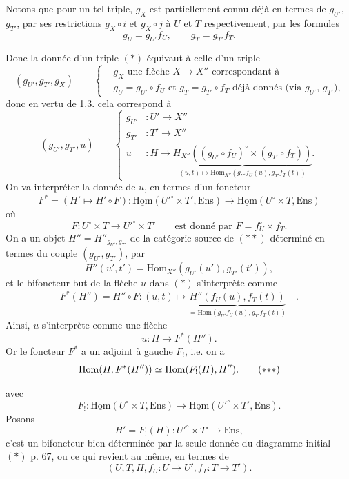 \documentclass[11pt]{article}
\newcommand{\printedpage}[1]{\marginpar{\footnotesize p.~#1}}
\newcommand{\msp}[1]{\marginpar{\footnotesize [#1]}}
\newcommand{\uHom}{\underline{\mathrm{Hom}}}
\newcommand{\Hom}{\mathrm{Hom}}
\newcommand{\Ens}{\mathrm{Ens}}
\begin{document}
Notons que pour un tel triple, $g_X$ est partiellement connu déjà en termes de $g_{U'}$, $g_{T'}$, par ses restrictions $g_X\circ i$ et $g_X\circ j$ à $U$ et $T$ respectivement, par les formules
\[
g_U = g_{U'}f_U, \qquad g_T = g_{T'}f_T.
\]

\msp{page 68} Donc la donnée d'un triple $(*)$ équivaut à celle d'un triple
\[
(g_{U'}, g_{T'}, g_X) \qquad
\left\{\begin{aligned}
&g_X \text{ une flèche } X\longrightarrow X'' \text{ correspondant à}\\
&g_U = g_{U'}\circ f_U \text{ et } g_T = g_{T'}\circ f_T \text{ déjà donnés (via } g_{U'}\text{, } g_{T'}\text{),}
\end{aligned}\right.
\]
donc en vertu de 1.3. cela correspond à
\[
(g_{U'}, g_{T'}, u) \qquad
\left\{\begin{aligned}
g_{U'} &: U' \longrightarrow X''\\
g_{T'} &: T' \longrightarrow X''\\
u &: H \longrightarrow \underbrace{H_{X''}\left((g_{U'}\circ f_U)^{\circ}\times(g_{T'}\circ f_T)\right)}_{(u,t)\longmapsto \Hom_{X''}(g_{U'}f_U(u),g_{T'}f_T(t))}.
\end{aligned}\right.
\tag*{$(*)$}
\]
On va interpréter la donnée de $u$, en termes d'un foncteur
\[
F^{*} = (H'\longmapsto H'\circ F) : \uHom(U'^{\circ}\times T',\Ens) \longrightarrow \uHom(U^{\circ}\times T,\Ens)
\tag*{$(**)$}
\]
où
\[
F : U^{\circ}\times T \longrightarrow U'^{\circ}\times T' \qquad \text{est donné par } F = f_U^{\circ}\times f_T.
\]
On a un objet $H''=H''_{g_{U'},g_{T'}}$ de la catégorie source de $(**)$ déterminé en termes du couple $(g_{U'},g_{T'})$, par
\[
H''(u',t') = \Hom_{X''}(g_{U'}(u'),g_{T'}(t')),
\]
et le bifoncteur but de la flèche $u$ dans $(*)$ s'interprète comme
\[
F^{*}(H'') = H''\circ F : (u,t)\longmapsto \underbrace{H''(f_U(u),f_T(t))}_{=\Hom(g_{U'}f_U(u),g_{T'}f_T(t))} \quad .
\]
Ainsi, $u$ s'interprète comme une flèche
\[
u : H \longrightarrow F^{*}(H'').
\]
Or le foncteur $F^{*}$ a un adjoint à gauche $F_{!}$, i.e. on a
\[
\Hom(H,F^{*}(H'')) \simeq \Hom(F_{!}(H),H'').
\tag*{$(*{*}*)$}
\]

\printedpage{50}
\msp{page 69} avec
\[
F_{!} : \uHom(U^{\circ}\times T,\Ens) \longrightarrow \uHom(U'^{\circ}\times T',\Ens).
\]
Posons
\[
H' = F_{!}(H) : U'^{\circ}\times T' \longrightarrow \Ens,
\]
c'est un bifoncteur bien déterminée par la seule donnée du diagramme initial $(*)$ p. 67, ou ce qui revient au même, en termes de %
\[
(U,T,H,f_U : U\longrightarrow U', f_T : T\longrightarrow T').
\]
\end{document}
